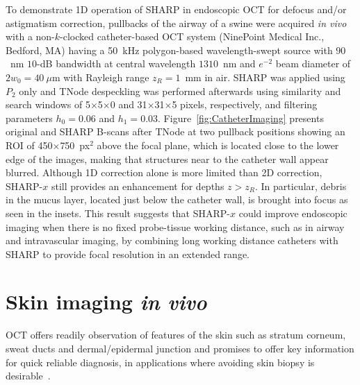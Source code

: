 To demonstrate 1D operation of SHARP in endoscopic OCT for defocus and/or astigmatism correction, pullbacks of the airway of a swine were acquired \textit{in vivo} with a non-$k$-clocked catheter-based OCT system (NinePoint Medical Inc., Bedford, MA) having a 50~kHz polygon-based wavelength-swept source with $90$~nm $10$-dB bandwidth at central wavelength $1310$~nm and $e^{-2}$ beam diameter of $2w_0=40~\mu$m with Rayleigh range $z_R=1$~mm in air. SHARP was applied using $P_2$ only and TNode despeckling was performed afterwards using similarity and search windows of 5$\times$5$\times$0 and 31$\times$31$\times$5 pixels, respectively, and filtering parameters $h_0 = 0.06$ and $h_1 = 0.03$. Figure~\ref{fig:CatheterImaging} presents original and SHARP B-scans after TNode at two pullback positions showing an ROI of 450$\times$750~px$^2$ above the focal plane, which is located close to the lower edge of the images, making that structures near to the catheter wall appear blurred. Although 1D correction alone is more limited than 2D correction, SHARP-$x$ still provides an enhancement for depths $z>z_R$. In particular, debris in the mucus layer, located just below the catheter wall, is brought into focus as seen in the insets. This result suggests that SHARP-$x$ could improve endoscopic imaging when there is no fixed probe-tissue working distance, such as in airway and intravascular imaging, by combining long working distance catheters with SHARP to provide focal resolution in an extended range.

\section{Skin imaging \textit{in vivo}}

OCT offers readily observation of features of the skin such as stratum corneum, sweat ducts and dermal/epidermal junction and promises to offer key information for quick reliable diagnosis, in applications where avoiding skin biopsy is desirable~\cite{Holmes2015_OCT}.

